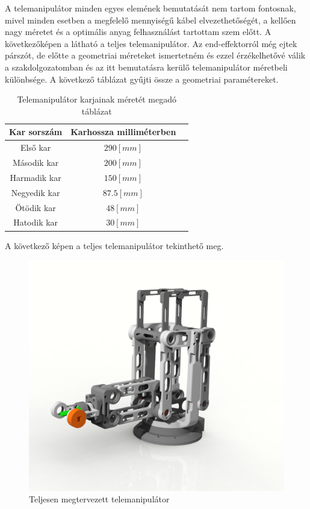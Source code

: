 A telemanipulátor minden egyes elemének bemutatását nem tartom fontosnak, mivel minden esetben a megfelelő mennyiségű kábel elvezethetőségét, a kellően nagy méretet és a optimális anyag felhasználást tartottam szem előtt. A következőképen a látható a teljes telemanipulátor. Az end-effektorról még ejtek párszót, de előtte a geometriai méreteket ismertetném és ezzel érzékelhetővé válik a szakdolgozatomban és az itt bemutatásra kerülő telemanipulátor méretbeli különbsége. A következő táblázat gyűjti össze a geometriai paramétereket.

\begin{table}[!ht]
\centering
\begin{tabular}{ |c|c|c| }
 \hline
 Kar sorszám & Karhossza milliméterben  \\
 \hline
 Első kar & $290[mm]$  \\
 \hline
 Második kar & $200[mm]$  \\
 \hline
 Harmadik kar & $150[mm]$  \\
 \hline
 Negyedik kar & $87.5[mm]$  \\
 \hline
 Ötödik kar & $48[mm]$  \\
 \hline
 Hatodik kar & $30[mm]$  \\
\hline
\end{tabular}
\caption{Telemanipulátor karjainak méretét megadó táblázat}
\label{table:merettabla}
\end{table}

A következő képen a teljes telemanipulátor tekinthető meg.

\begin{figure}[!ht]
\centering
\includegraphics[width=120mm, keepaspectratio]{figures/Diploma_CAD/creo1.png}
\caption{Teljesen megtervezett telemanipulátor}
\label{fig:Telemnanipulátor}
\end{figure}


